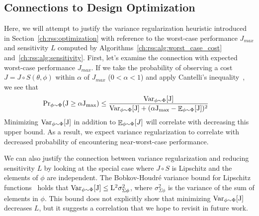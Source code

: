 
\subsection{Connections to Design Optimization}\label{ch:rss:connection_to_robustness}

Here, we will attempt to justify the variance regularization heuristic introduced in Section~\ref{ch:rss:optimization} with reference to the worst-case performance $J_{max}$ and sensitivity $L$ computed by Algorithms~\ref{ch:rss:alg:worst_case_cost} and~\ref{ch:rss:alg:sensitivity}. First, let's examine the connection with expected worst-case performance $J_{max}$. If we take the probability of observing a cost $J = J\circ S(\theta, \phi)$ within $\alpha$ of $J_{max}$ ($0 < \alpha < 1$) and apply Cantelli's inequality~\cite{boucheron_lugosi_massart_2016}, we see that
\begin{align*}
    \rm{Pr}_{\phi \sim \Phi}(J \geq \alpha J_{max}) & \leq \frac{\rm{Var}_{\phi \sim \Phi}[J]}{\rm{Var}_{\phi \sim \Phi}[J] + (\alpha J_{max} - \mathop{\mathbb{E}}_{\phi \sim \Phi}[J])^2}
\end{align*}
Minimizing $\rm{Var}_{\phi \sim \Phi}[J]$ in addition to $\mathop{\mathbb{E}}_{\phi \sim \Phi}[J]$ will correlate with decreasing this upper bound. As a result, we expect variance regularization to correlate with decreased probability of encountering near-worst-case performance.

We can also justify the connection between variance regularization and reducing sensitivity $L$ by looking at the special case where $J \circ S$ is Lipschitz and the elements of $\phi$ are independent. The Bobkov-Houdr\'e variance bound for Lipschitz functions~\cite{bobkov} holds that $\rm{Var}_{\phi \sim \Phi}[J] \leq L^2 \sigma_{\Sigma\phi}^2$,
where $\sigma_{\Sigma\phi}^2$ is the variance of the sum of elements in $\phi$. This bound does not explicitly show that minimizing $\rm{Var}_{\phi \sim \Phi}[J]$ decreases $L$, but it suggests a correlation that we hope to revisit in future work.

